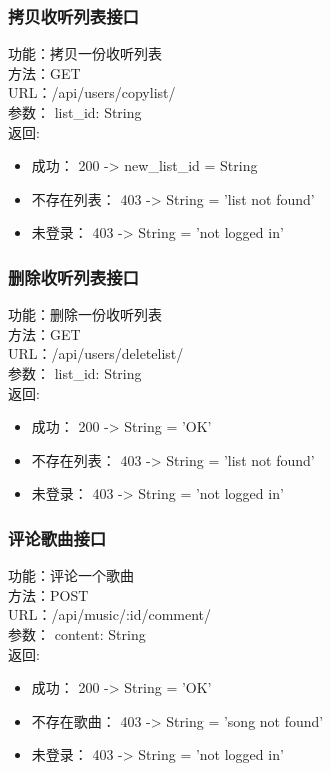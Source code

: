 \subsubsection{拷贝收听列表接口}

\noindent
功能：拷贝一份收听列表\\
方法：GET\\
URL：/api/users/copylist/\\
参数： list\_id: String\\
返回:
\begin{itemize}
	\item 成功： 200 -> new\_list\_id = String
	\item 不存在列表： 403 -> String = 'list not found'
	\item 未登录： 403 -> String = 'not logged in'
\end{itemize}

\subsubsection{删除收听列表接口}

\noindent
功能：删除一份收听列表\\
方法：GET\\
URL：/api/users/deletelist/\\
参数： list\_id: String\\
返回:
\begin{itemize}
	\item 成功： 200 -> String = 'OK'
	\item 不存在列表： 403 -> String = 'list not found'
	\item 未登录： 403 -> String = 'not logged in'
\end{itemize}

\subsubsection{评论歌曲接口}

\noindent
功能：评论一个歌曲\\
方法：POST\\
URL：/api/music/:id/comment/\\
参数： content: String\\
返回:
\begin{itemize}
	\item 成功： 200 -> String = 'OK'
	\item 不存在歌曲： 403 -> String = 'song not found'
	\item 未登录： 403 -> String = 'not logged in'
\end{itemize}

